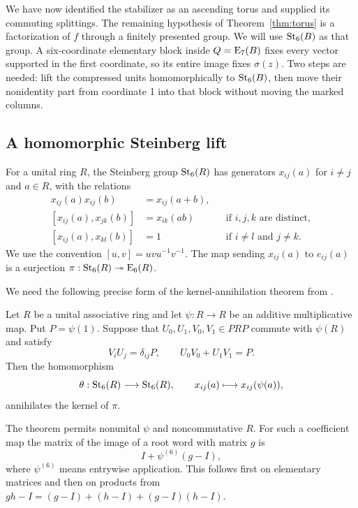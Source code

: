 We have now identified the stabilizer as an ascending torus and supplied
its commuting splittings.  The remaining hypothesis of
Theorem~\ref{thm:torus} is a factorization of $f$ through a finitely
presented group.  We will use $\mathrm{St}_6(B)$ as that group.  A six-coordinate
elementary block inside $Q=\mathrm E_7(B)$ fixes every vector supported in the
first coordinate, so its entire image fixes $\sigma(z)$.  Two steps are
needed: lift the compressed units homomorphically to $\mathrm{St}_6(B)$, then
move their nonidentity part from coordinate 1 into that block without
moving the marked columns.

\subsection{A homomorphic Steinberg lift}

For a unital ring $R$, the Steinberg group $\mathrm{St}_6(R)$ has generators
$x_{ij}(a)$ for $i\ne j$ and $a\in R$, with the relations
\begin{align*}
 x_{ij}(a)x_{ij}(b)&=x_{ij}(a+b),\\
 [x_{ij}(a),x_{jk}(b)]&=x_{ik}(ab)
       &&\text{if }i,j,k\text{ are distinct},\\
 [x_{ij}(a),x_{kl}(b)]&=1
       &&\text{if }i\ne l\text{ and }j\ne k.
\end{align*}
We use the convention $[u,v]=uvu^{-1}v^{-1}$.
The map sending $x_{ij}(a)$ to $e_{ij}(a)$ is a surjection
$\pi:\mathrm{St}_6(R)\twoheadrightarrow\mathrm E_6(R)$.

We need the following precise form of the kernel-annihilation theorem
from \citet[Theorem~4.1]
{FoundationsCompanion}.

\begin{theorem}\label{thm:stage-kernel}
Let $R$ be a unital associative ring and let $\psi:R\to R$ be an
additive multiplicative map.  Put $P=\psi(1)$.  Suppose that
$U_0,U_1,V_0,V_1\in PRP$ commute with $\psi(R)$ and satisfy
\[
 V_iU_j=\delta_{ij}P,
 \qquad U_0V_0+U_1V_1=P.
\]
Then the homomorphism
\[
 \theta:\mathrm{St}_6(R)\longrightarrow\mathrm{St}_6(R),
 \qquad x_{ij}(a)\longmapsto x_{ij}(\psi(a)),
\]
annihilates the kernel of $\pi$.
\end{theorem}

The theorem permits nonunital $\psi$ and noncommutative $R$.
For such a coefficient map the matrix of the image of a root word
with matrix $g$ is
\begin{equation}\label{eq:stage-nonunital-matrix}
 I+\psi^{(6)}(g-I),
\end{equation}
where $\psi^{(6)}$ means entrywise application.  This follows first
on elementary matrices and then on products from
$gh-I=(g-I)+(h-I)+(g-I)(h-I)$.

